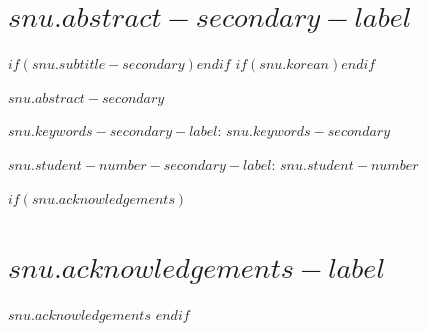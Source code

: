 \clearpage
\chapter*{$snu.abstract-secondary-label$}
\begin{center}
$if(snu.subtitle-secondary)$$endif$
\vspace{0.6cm}
$if(snu.korean)$$endif$
\end{center}
\vspace{0.5cm}
$snu.abstract-secondary$
\begin{samepage}
\par\vspace{1em}\noindent\textbf{$snu.keywords-secondary-label$}: $snu.keywords-secondary$\par
\noindent $snu.student-number-secondary-label$: $snu.student-number$\par
\end{samepage}
$if(snu.acknowledgements)$
\clearpage
\chapter*{$snu.acknowledgements-label$}
$snu.acknowledgements$
$endif$
